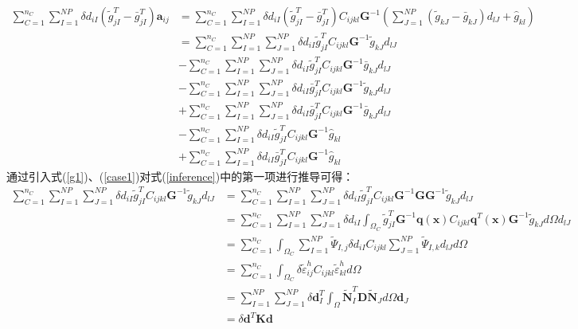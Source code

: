 \begin{equation}\label{inference}
\begin{split}
    \sum_{C=1}^{n_C}\sum_{I=1}^{N\!P}\delta d_{iI}(\tilde{g}_{jI}^T-\bar{g}_{jI}^T)\pmb{a}_{ij}&=\sum_{C=1}^{n_C}\sum_{I=1}^{N\!P}\delta d_{iI}(\tilde{g}_{jI}^T-\bar{g}_{jI}^T)C_{ijkl}\pmb{G}^{-1}(\sum_{J=1}^{N\!P}(\tilde{g}_{kJ}-\bar{g}_{kJ})d_{lJ}+\hat{g}_{kl})\\
    &=\sum_{C=1}^{n_C}\sum_{I=1}^{N\!P}\sum_{J=1}^{N\!P}\delta d_{iI}\tilde{g}^T_{jI}C_{ijkl}\pmb{G}^{-1}\tilde{g}_{kJ}d_{lJ}\\
    &-\sum_{C=1}^{n_C}\sum_{I=1}^{N\!P}\sum_{J=1}^{N\!P}\delta d_{iI}\tilde{g}^T_{jI}C_{ijkl}\pmb{G}^{-1}\bar{g}_{kJ}d_{lJ}\\
    &-\sum_{C=1}^{n_C}\sum_{I=1}^{N\!P}\sum_{J=1}^{N\!P}\delta d_{iI}\bar{g}^T_{jI}C_{ijkl}\pmb{G}^{-1}\tilde{g}_{kJ}d_{lJ}\\
    &+\sum_{C=1}^{n_C}\sum_{I=1}^{N\!P}\sum_{J=1}^{N\!P}\delta d_{iI}\bar{g}^T_{jI}C_{ijkl}\pmb{G}^{-1}\bar{g}_{kJ}d_{lJ}\\
    &-\sum_{C=1}^{n_C}\sum_{I=1}^{N\!P}\delta d_{iI}\tilde{g}_{jI}^TC_{ijkl}\pmb{G}^{-1}\hat{g}_{kl}\\
    &+\sum_{C=1}^{n_C}\sum_{I=1}^{N\!P}\delta d_{iI}\bar{g}_{jI}^TC_{ijkl}\pmb{G}^{-1}\hat{g}_{kl}
\end{split}
\end{equation}
通过引入式(\ref{g1})、(\ref{case1})对式(\ref{inference})中的第一项进行推导可得：
\begin{equation}
\begin{split}
    \sum_{C=1}^{n_C}\sum_{I=1}^{N\!P}\sum_{J=1}^{N\!P}\delta d_{iI}\tilde{g}^T_{jI}C_{ijkl}\pmb{G}^{-1}\tilde{g}_{kJ}d_{lJ}&=\sum_{C=1}^{n_C}\sum_{I=1}^{N\!P}\sum_{J=1}^{N\!P}\delta d_{iI}\tilde{g}^T_{jI}C_{ijkl}\pmb{G}^{-1}\pmb{G}\pmb{G}^{-1}\tilde{g}_{kJ}d_{lJ}\\
&=\sum_{C=1}^{n_C}\sum_{I=1}^{N\!P}\sum_{J=1}^{N\!P}\delta d_{iI}\int_{\Omega_C}\tilde{g}_{jI}^T\pmb{G}^{-1}\pmb{q}(\pmb{x})C_{ijkl}\pmb{q}^T(\pmb{x})\pmb{G}^{-1}\tilde{g}_{kJ}d\Omega d_{lJ}\\
&=\sum_{C=1}^{n_C}\int_{\Omega_C}\sum_{I=1}^{N\!P}\tilde{\Psi}_{I,j}\delta d_{iI}C_{ijkl}\sum_{J=1}^{N\!P}\tilde{\Psi}_{I,k}d_{lJ}d\Omega\\
&=\sum_{C=1}^{n_C}\int_{\Omega_C}\delta\tilde{\varepsilon}_{ij}^hC_{ijkl}\tilde{\varepsilon}_{kl}^hd\Omega\\
&=\sum_{I=1}^{N\!P}\sum_{J=1}^{N\!P}\delta\pmb{d}^T_I\int_{\Omega}\tilde{\pmb{N}}_I^T\pmb{D}\tilde{\pmb{N}}_Jd\Omega\pmb{d}_J\\
&=\delta\pmb{d}^T\pmb{K}\pmb{d}
\end{split}
\end{equation}
